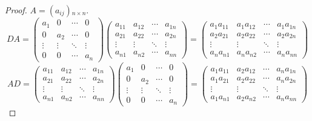 \begin{proof}
    $A = (a_{ij}){}_{n\times n}$.
    \[
        DA =
        \begin{pmatrix}
            a_{1}  & 0      & \cdots & 0      \\
            0      & a_{2}  & \cdots & 0      \\
            \vdots & \vdots & \ddots & \vdots \\
            0      & 0      & \cdots & a_{n}
        \end{pmatrix}
        \begin{pmatrix}
            a_{11} & a_{12} & \cdots & a_{1n} \\
            a_{21} & a_{22} & \cdots & a_{2n} \\
            \vdots & \vdots & \ddots & \vdots \\
            a_{n1} & a_{n2} & \cdots & a_{nn}
        \end{pmatrix}
        =
        \begin{pmatrix}
            a_{1}a_{11} & a_{1}a_{12} & \cdots & a_{1}a_{1n} \\
            a_{2}a_{21} & a_{2}a_{22} & \cdots & a_{2}a_{2n} \\
            \vdots      & \vdots      & \ddots & \vdots      \\
            a_{n}a_{n1} & a_{n}a_{n2} & \cdots & a_{n}a_{nn}
        \end{pmatrix}
    \]
    \[
        AD =
        \begin{pmatrix}
            a_{11} & a_{12} & \cdots & a_{1n} \\
            a_{21} & a_{22} & \cdots & a_{2n} \\
            \vdots & \vdots & \ddots & \vdots \\
            a_{n1} & a_{n2} & \cdots & a_{nn}
        \end{pmatrix}
        \begin{pmatrix}
            a_{1}  & 0      & \cdots & 0      \\
            0      & a_{2}  & \cdots & 0      \\
            \vdots & \vdots & \ddots & \vdots \\
            0      & 0      & \cdots & a_{n}
        \end{pmatrix}
        =
        \begin{pmatrix}
            a_{1}a_{11} & a_{2}a_{12} & \cdots & a_{n}a_{1n} \\
            a_{1}a_{21} & a_{2}a_{22} & \cdots & a_{n}a_{2n} \\
            \vdots      & \vdots      & \ddots & \vdots      \\
            a_{1}a_{n1} & a_{2}a_{n2} & \cdots & a_{n}a_{nn}
        \end{pmatrix}
    \]
\end{proof}

